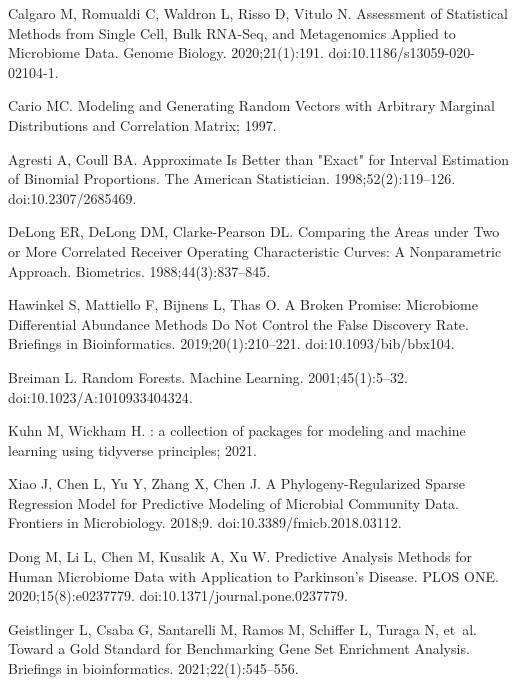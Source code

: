 \documentclass[10pt,letterpaper]{article}
\begin{document}
\begin{thebibliography}{10}
Calgaro M, Romualdi C, Waldron L, Risso D, Vitulo N.
\newblock Assessment of Statistical Methods from Single Cell, Bulk {{RNA}}-Seq,
  and Metagenomics Applied to Microbiome Data.
\newblock Genome Biology. 2020;21(1):191.
\newblock doi:{10.1186/s13059-020-02104-1}.

Cario MC.
\newblock Modeling and {{Generating Random Vectors}} with {{Arbitrary Marginal
  Distributions}} and {{Correlation Matrix}}; 1997.

Agresti A, Coull BA.
\newblock Approximate {{Is Better}} than "{{Exact}}" for {{Interval
  Estimation}} of {{Binomial Proportions}}.
\newblock The American Statistician. 1998;52(2):119--126.
\newblock doi:{10.2307/2685469}.

DeLong ER, DeLong DM, {Clarke-Pearson} DL.
\newblock Comparing the Areas under Two or More Correlated Receiver Operating
  Characteristic Curves: A Nonparametric Approach.
\newblock Biometrics. 1988;44(3):837--845.

Hawinkel S, Mattiello F, Bijnens L, Thas O.
\newblock A Broken Promise: Microbiome Differential Abundance Methods Do Not
  Control the False Discovery Rate.
\newblock Briefings in Bioinformatics. 2019;20(1):210--221.
\newblock doi:{10.1093/bib/bbx104}.

Breiman L.
\newblock Random {{Forests}}.
\newblock Machine Learning. 2001;45(1):5--32.
\newblock doi:{10.1023/A:1010933404324}.

Kuhn M, Wickham H.
: a collection of packages for modeling and machine learning using tidyverse        principles; 2021.

Xiao J, Chen L, Yu Y, Zhang X, Chen J.
\newblock A {{Phylogeny}}-{{Regularized Sparse Regression Model}} for
  {{Predictive Modeling}} of {{Microbial Community Data}}.
\newblock Frontiers in Microbiology. 2018;9.
\newblock doi:{10.3389/fmicb.2018.03112}.

Dong M, Li L, Chen M, Kusalik A, Xu W.
\newblock Predictive Analysis Methods for Human Microbiome Data with
  Application to {{Parkinson}}'s Disease.
\newblock PLOS ONE. 2020;15(8):e0237779.
\newblock doi:{10.1371/journal.pone.0237779}.

Geistlinger L, Csaba G, Santarelli M, Ramos M, Schiffer L, Turaga N, et~al.
\newblock Toward a Gold Standard for Benchmarking Gene Set Enrichment Analysis.
\newblock Briefings in bioinformatics. 2021;22(1):545--556.


\end{thebibliography}
\end{document}
